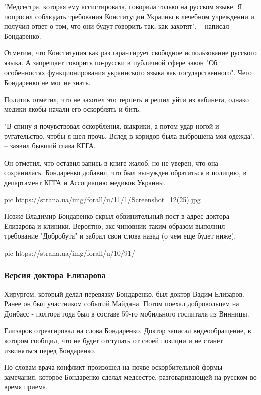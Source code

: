 "Медсестра, которая ему ассистировала, говорила только на русском языке. Я
попросил соблюдать требования Конституции Украины в лечебном учреждении и
получил ответ о том, что они будут говорить так, как захотят", – написал
Бондаренко.

Отметим, что Конституция как раз гарантирует свободное использование русского
языка. А запрещает говорить по-русски в публичной сфере закон "Об особенностях
функционирования украинского языка как государственного". Чего Бондаренко не
мог не знать. 

Политик отметил, что не захотел это терпеть и решил уйти из кабинета, однако
медики якобы начали его оскорблять и бить. 

"В спину я почувствовал оскорбления, выкрики, а потом удар ногой и
ругательство, чтобы я шел прочь. Вслед в коридор была выброшена моя одежда", –
заявил бывший глава КГГА. 

Он отметил, что оставил запись в книге жалоб, но не уверен, что она
сохранилась. Бондаренко добавил, что был вынужден обратиться в полицию, в
департамент КГГА и Ассоциацию медиков Украины.

\ifcmt
pic https://strana.ua/img/forall/u/11/1/Screenshot_12(25).jpg
\fi

Позже Владимир Бондаренко скрыл обвинительный пост в адрес доктора Елизарова и
клиники. Вероятно, экс-чиновник таким образом выполнил требование "Добробута" и
забрал свои слова назад (о чем еще будет ниже). 

\ifcmt
pic https://strana.ua/img/forall/u/10/91/%
\fi

\subsubsection{Версия доктора Елизарова}

Хирургом, который делал перевязку Бондаренко, был доктор Вадим Елизаров. Ранее
он был участником событий Майдана. Потом поехал добровольцем на Донбасс -
полтора года был в составе 59-го мобильного госпиталя из Винницы.

Елизаров отреагировал на слова Бондаренко. Доктор записал видеообращение, в
котором сообщил, что не будет отступать от своей позиции и не станет извиняться
перед Бондаренко.

По словам врача конфликт произошел на почве оскорбительной формы замечания,
которое Бондаренко сделал медсестре, разговаривающей на русском во время
приема. 

